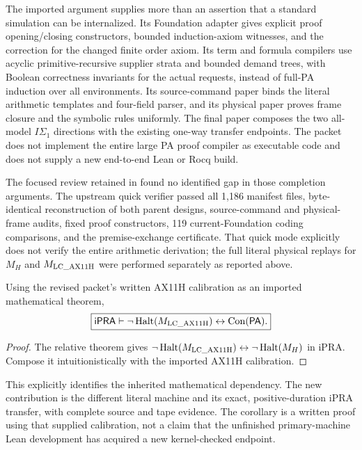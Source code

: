 The imported argument supplies more than an assertion that a standard
simulation can be internalized. Its Foundation adapter gives explicit
proof opening/closing constructors, bounded induction-axiom witnesses,
and the correction for the changed finite order axiom. Its term and
formula compilers use acyclic primitive-recursive supplier strata and
bounded demand trees, with Boolean correctness invariants for the
actual requests, instead of full-PA induction over all environments.
Its source-command paper binds the literal arithmetic templates and
four-field parser, and its physical paper proves frame closure and
the symbolic rules uniformly. The final paper composes the two
all-model $I\Sigma_1$ directions with the existing one-way transfer
endpoints. The packet does not implement the entire large PA proof
compiler as executable code and does not supply a new end-to-end
Lean or Rocq build.

The focused review retained in 
found no identified gap in those completion arguments. The upstream
quick verifier passed all 1,186 manifest files, byte-identical
reconstruction of both parent designs, source-command and physical-frame
audits, fixed proof constructors, 119 current-Foundation coding
comparisons, and the premise-exchange certificate. That quick mode
explicitly does not verify the entire arithmetic derivation; the full
literal physical replays for $M_H$ and $M_{\mathrm{LC\_AX11H}}$ were performed separately
as reported above.

\begin{theorem}
Using the revised packet's written AX11H calibration as an imported
mathematical theorem,
\[
 \boxed{\mathsf{iPRA}\vdash\neg\operatorname{Halt}(M_{\mathrm{LC\_AX11H}})\leftrightarrow\operatorname{Con}(\mathsf{PA}).}
\]
\end{theorem}
\begin{proof}
The relative theorem gives
$\neg\operatorname{Halt}(M_{\mathrm{LC\_AX11H}})\leftrightarrow\neg\operatorname{Halt}(M_H)$ in iPRA.
Compose it intuitionistically with the imported AX11H calibration.
\end{proof}

This explicitly identifies the inherited mathematical dependency.
The new contribution is the different literal machine and its exact,
positive-duration iPRA transfer, with complete source and tape evidence.
The corollary is a written proof using that supplied calibration, not
a claim that the unfinished primary-machine Lean development has acquired
a new kernel-checked endpoint.
